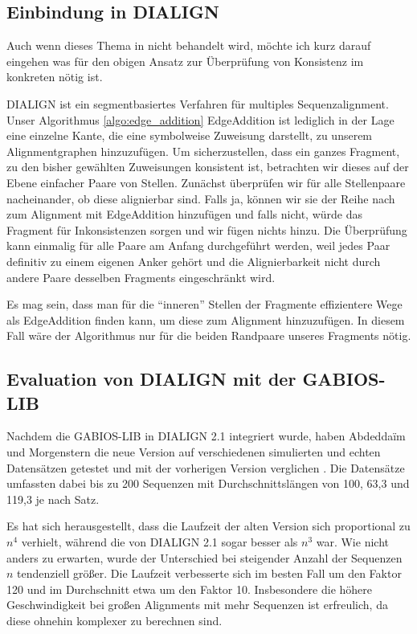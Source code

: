 \subsection{Einbindung in DIALIGN}

Auch wenn dieses Thema in \cite{am00} nicht behandelt wird, möchte ich kurz darauf eingehen was für den obigen Ansatz zur Überprüfung von Konsistenz im konkreten nötig ist. 

DIALIGN ist ein segmentbasiertes Verfahren für multiples Sequenzalignment. Unser Algorithmus \ref{algo:edge_addition} \textrm{EdgeAddition} ist lediglich in der Lage eine einzelne Kante, die eine symbolweise Zuweisung darstellt, zu unserem Alignmentgraphen hinzuzufügen. Um sicherzustellen, dass ein ganzes Fragment, zu den bisher gewählten Zuweisungen konsistent ist, betrachten wir dieses auf der Ebene einfacher Paare von Stellen. Zunächst überprüfen wir für alle Stellenpaare nacheinander, ob diese alignierbar sind. Falls ja, können wir sie der Reihe nach zum Alignment mit \textrm{EdgeAddition} hinzufügen und falls nicht, würde das Fragment für Inkonsistenzen sorgen und wir fügen nichts hinzu. Die Überprüfung kann einmalig für alle Paare am Anfang durchgeführt werden, weil jedes Paar definitiv zu einem eigenen Anker gehört und die Alignierbarkeit nicht durch andere Paare desselben Fragments eingeschränkt wird.

Es mag sein, dass man für die \enquote{inneren} Stellen der Fragmente effizientere Wege  als \textrm{EdgeAddition} finden kann, um diese zum Alignment hinzuzufügen. In diesem Fall wäre der Algorithmus nur für die beiden Randpaare unseres Fragments nötig.

\subsection{Evaluation von DIALIGN mit der GABIOS-LIB}

Nachdem die GABIOS-LIB in DIALIGN 2.1 integriert wurde, haben Abdedda\"im und Morgenstern die neue Version auf verschiedenen simulierten und echten Datensätzen getestet und mit der vorherigen Version verglichen \cite{am00}. Die Datensätze umfassten dabei bis zu 200 Sequenzen mit Durchschnittslängen von 100, 63,3 und 119,3 je nach Satz. 

Es hat sich herausgestellt, dass die Laufzeit der alten Version sich proportional zu $n^4$ verhielt, während die von DIALIGN 2.1 sogar besser als $n^3$ war. Wie nicht anders zu erwarten, wurde der Unterschied bei steigender Anzahl der Sequenzen $n$ tendenziell größer. Die Laufzeit verbesserte sich im besten Fall um den Faktor 120 und im Durchschnitt etwa um den Faktor 10. Insbesondere die höhere Geschwindigkeit bei großen Alignments mit mehr Sequenzen ist erfreulich, da diese ohnehin komplexer zu berechnen sind.

